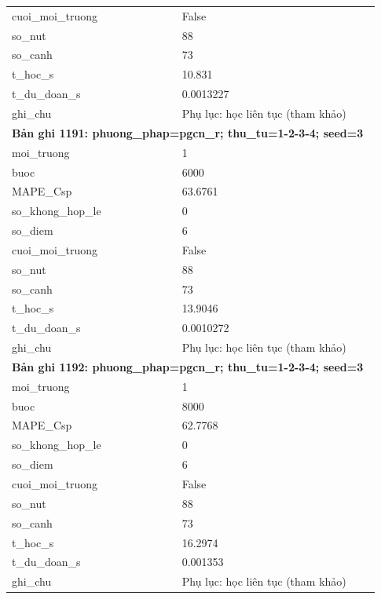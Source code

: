 \begin{longtable}{p{0.43\linewidth}p{0.50\linewidth}}
cuoi\_\allowbreak moi\_\allowbreak truong & False \\
so\_\allowbreak nut & 88 \\
so\_\allowbreak canh & 73 \\
t\_\allowbreak hoc\_\allowbreak s & 10.831 \\
t\_\allowbreak du\_\allowbreak doan\_\allowbreak s & 0.0013227 \\
ghi\_\allowbreak chu & Phụ lục: học liên tục (tham khảo) \\
\midrule
\multicolumn{2}{p{0.95\linewidth}}{\textbf{Bản ghi 1191: phuong\_phap=pgcn\_r; thu\_tu=1-2-3-4; seed=3}} \\
moi\_\allowbreak truong & 1 \\
buoc & 6000 \\
MAPE\_\allowbreak Csp & 63.6761 \\
so\_\allowbreak khong\_\allowbreak hop\_\allowbreak le & 0 \\
so\_\allowbreak diem & 6 \\
cuoi\_\allowbreak moi\_\allowbreak truong & False \\
so\_\allowbreak nut & 88 \\
so\_\allowbreak canh & 73 \\
t\_\allowbreak hoc\_\allowbreak s & 13.9046 \\
t\_\allowbreak du\_\allowbreak doan\_\allowbreak s & 0.0010272 \\
ghi\_\allowbreak chu & Phụ lục: học liên tục (tham khảo) \\
\midrule
\multicolumn{2}{p{0.95\linewidth}}{\textbf{Bản ghi 1192: phuong\_phap=pgcn\_r; thu\_tu=1-2-3-4; seed=3}} \\
moi\_\allowbreak truong & 1 \\
buoc & 8000 \\
MAPE\_\allowbreak Csp & 62.7768 \\
so\_\allowbreak khong\_\allowbreak hop\_\allowbreak le & 0 \\
so\_\allowbreak diem & 6 \\
cuoi\_\allowbreak moi\_\allowbreak truong & False \\
so\_\allowbreak nut & 88 \\
so\_\allowbreak canh & 73 \\
t\_\allowbreak hoc\_\allowbreak s & 16.2974 \\
t\_\allowbreak du\_\allowbreak doan\_\allowbreak s & 0.001353 \\
ghi\_\allowbreak chu & Phụ lục: học liên tục (tham khảo) \\

\end{longtable}
